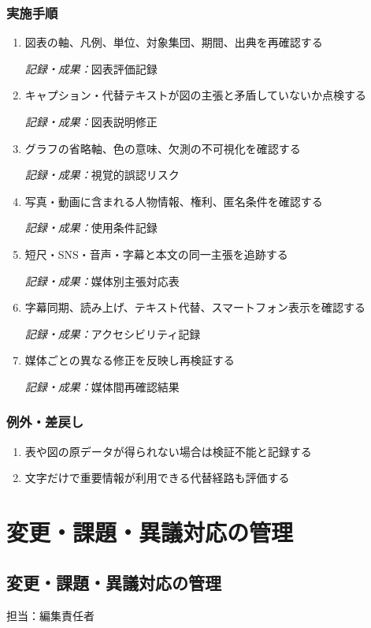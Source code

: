 \documentclass[a4paper,11pt]{article}
\begin{document}
\subsubsection*{実施手順}
\begin{enumerate}[leftmargin=2em,itemsep=0.65em]
\item 図表の軸、凡例、単位、対象集団、期間、出典を再確認する\par\noindent\textit{記録・成果：}図表評価記録\nobreak\smallskip
\item キャプション・代替テキストが図の主張と矛盾していないか点検する\par\noindent\textit{記録・成果：}図表説明修正\nobreak\smallskip
\item グラフの省略軸、色の意味、欠測の不可視化を確認する\par\noindent\textit{記録・成果：}視覚的誤認リスク\nobreak\smallskip
\item 写真・動画に含まれる人物情報、権利、匿名条件を確認する\par\noindent\textit{記録・成果：}使用条件記録\nobreak\smallskip
\item 短尺・SNS・音声・字幕と本文の同一主張を追跡する\par\noindent\textit{記録・成果：}媒体別主張対応表\nobreak\smallskip
\item 字幕同期、読み上げ、テキスト代替、スマートフォン表示を確認する\par\noindent\textit{記録・成果：}アクセシビリティ記録\nobreak\smallskip
\item 媒体ごとの異なる修正を反映し再検証する\par\noindent\textit{記録・成果：}媒体間再確認結果\nobreak\smallskip
\end{enumerate}
\subsubsection*{例外・差戻し}
\begin{enumerate}[leftmargin=2em,itemsep=0.35em]
\item 表や図の原データが得られない場合は検証不能と記録する
\item 文字だけで重要情報が利用できる代替経路も評価する
\end{enumerate}
\section{変更・課題・異議対応の管理}
\subsection{変更・課題・異議対応の管理}
\par 担当：編集責任者\par\medskip
\end{document}
